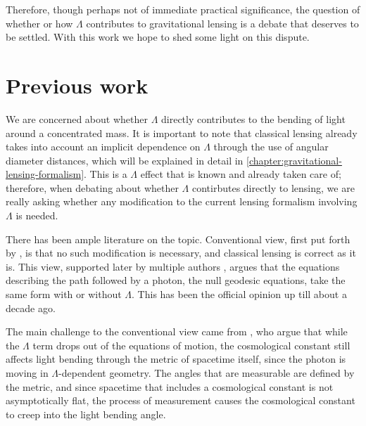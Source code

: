 Therefore, though perhaps not of immediate practical significance, the question of whether or how $\Lambda$ contributes to gravitational lensing is a debate that deserves to be settled. With this work we hope to shed some light on this dispute. 



\section{Previous work}

We are concerned about whether $\Lambda$ directly contributes to the bending of light around a concentrated mass. It is important to note that classical lensing already takes into account an implicit dependence on $\Lambda$ through the use of angular diameter distances, which will be explained in detail in \autoref{chapter:gravitational-lensing-formalism}. This is a $\Lambda$ effect that is known and already taken care of; therefore, when debating about whether $\Lambda$ contirbutes directly to lensing, we are really asking whether any modification to the current lensing formalism involving $\Lambda$ is needed. 

There has been ample literature on the topic. Conventional view, first put forth by \citet{islam1983cosmological}, is that no such modification is necessary, and classical lensing is correct as it is. This view, supported later by multiple authors \citep{lake2002bending,park2008rigorous,simpson2010lensing,khriplovich2008does}, argues that the equations describing the path followed by a photon, the null geodesic equations, take the same form with or without $\Lambda$. This has been the official opinion up till about a decade ago. 

The main challenge to the conventional view came from \citet{rindler2007contribution}, who argue that while the $\Lambda$ term drops out of the equations of motion, the cosmological constant still affects light bending through the metric of spacetime itself, since the photon is moving in $\Lambda$-dependent geometry. The angles that are measurable are defined by the metric, and since spacetime that includes a cosmological constant is not asymptotically flat, the process of measurement causes the cosmological constant to creep into the light bending angle. 

